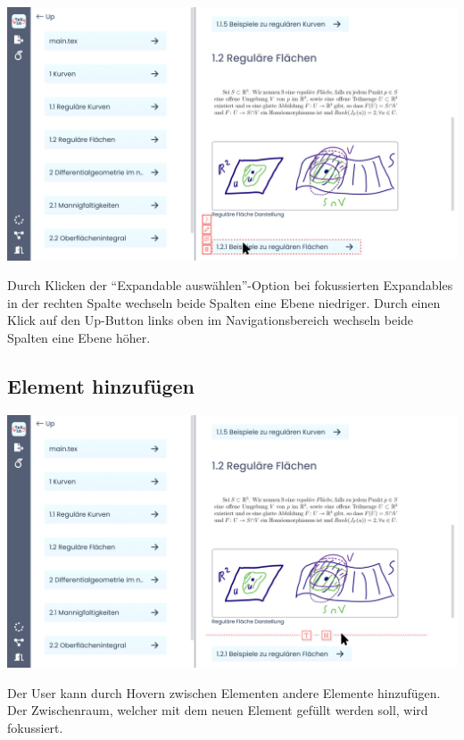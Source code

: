 \begin{minipage}{\linewidth}
  \includegraphics[width=\textwidth]{assets/img/Select_Expandable}
\end{minipage}

Durch Klicken der \enquote{Expandable auswählen}-Option bei fokussierten Expandables in der rechten Spalte wechseln
beide Spalten eine Ebene niedriger.
Durch einen Klick auf den Up-Button links oben im Navigationsbereich wechseln beide Spalten eine Ebene höher.

\subsection{Element hinzufügen}
\label{subsec:element-hinzufuegen}

\begin{minipage}{\linewidth}
  \includegraphics[width=\textwidth]{assets/img/Item_Add_Hover}
\end{minipage}

Der User kann durch Hovern zwischen Elementen andere Elemente hinzufügen.
Der Zwischenraum, welcher mit dem neuen Element gefüllt werden soll, wird fokussiert.

